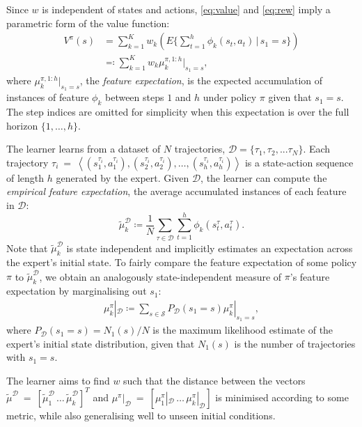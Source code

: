 \documentclass{aamas2016}
\begin{document}
Since $w$ is independent of states and actions, \eqref{eq:value} and \eqref{eq:rew} imply a parametric form of the value function:
\begin{align}
 	V^{\pi}(s) &= \sum^K_{k=1}w_k\left(E\{\sum_{t = 1}^h\phi_k(s_t,a_t)\,\vert\, s_1 = s\}\right)\\
&\eqqcolon\sum^K_{k=1}w_k\mu^{\pi, 1:h}_k|_{s_1=s},\label{eq:parametrized_value}
\end{align}
where $\mu^{\pi,1:h}_k|_{s_1=s}$, the \emph{feature expectation}, is the expected accumulation of instances of feature $\phi_k$ between steps $1$ and $h$ under policy $\pi$  given that $s_1 = s$. The step indices are omitted for simplicity when this expectation is over the full horizon $\{1,\ldots,h\}$.

The learner learns from a dataset of $N$ trajectories, $\mathcal{D} = \big\{ \tau_1,\tau_2,...\tau_N \big\}$. Each trajectory $\tau_i~=~\left<(s^{\tau_i}_1,a^{\tau_i}_1),(s^{\tau_i}_2,a^{\tau_i}_2),\ldots,(s^{\tau_i}_{h},a^{\tau_i}_{h})\right>$ is a state-action sequence of length $h$ generated by the expert.
Given $\mathcal{D}$, the learner can compute the \emph{empirical feature expectation}, the average accumulated instances of each feature in $\mathcal{D}$:
\begin{equation}
	\widetilde{\mu}^{\mathcal{D}}_k \coloneqq\frac{1}{N}\sum_{\tau\in\mathcal{D}}\sum_{t=1}^{h}\phi_k(s^\tau_t,a^\tau_t). \label{eqn:empirical_fe}
\end{equation}
Note that $\widetilde{\mu}^{\mathcal{D}}_k$ is state independent and implicitly estimates an expectation across
the expert's initial state.  To fairly compare the feature expectation of some policy $\pi$ to $\widetilde{\mu}^{\mathcal{D}}_k$, we obtain an analogously state-independent measure of $\pi$'s feature expectation by marginalising out $s_1$:
\begin{align}
  \label{eq:feature_expectation_belief}
  \mu^{\pi}_k|_{\mathcal{D}} \coloneqq \sum_{s\in\mathcal{S}}P_{\mathcal{D}}(s_1 = s)\mu^{\pi}_k|_{s_1=s},
\end{align}
where $P_{\mathcal{D}}(s_1 = s)= N_1(s)/N$ is the maximum likelihood estimate of the expert's initial state distribution, given that $N_1(s)$ is the number of trajectories with $s_1 = s$.

The learner aims to find $w$ such that the distance between the vectors $\widetilde\mu^{\mathcal{D}}~=~[\widetilde\mu^{\mathcal{D}}_1\,\ldots\,\widetilde\mu^{\mathcal{D}}_k]^T$ and $\mu^{\pi}|_{\mathcal{D}}~=~[\mu^{\pi}_1|_{\mathcal{D}}\,\ldots\,\mu^{\pi}_k|_{\mathcal{D}}]$ is minimised according to some metric, while also generalising well to unseen initial conditions.
\end{document}

